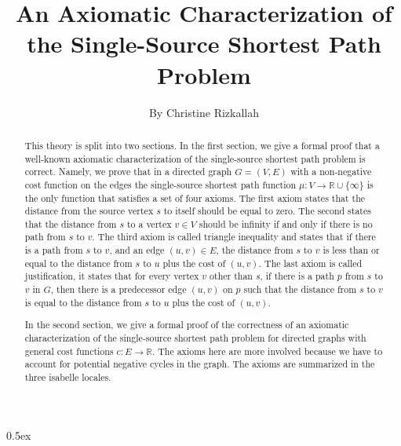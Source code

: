 \documentclass[11pt,a4paper]{article}
\newcommand{\real}{\mathbb{R}}
\begin{document}
\title{An Axiomatic Characterization of the Single-Source Shortest Path Problem}
\author{By Christine Rizkallah}
\maketitle

\begin{abstract}
 This theory is split into two sections. In the first section, we give a formal proof that a well-known axiomatic characterization of the single-source shortest path problem is correct. Namely, we prove that in a directed graph $G=(V,E)$ with a non-negative cost function on the edges the single-source shortest path function $\mu:V\to\real\cup\{\infty\}$ is the only function that satisfies a set of four axioms. The first axiom states that the distance from the source vertex $s$ to itself should be equal to zero. The second states that the distance from $s$ to a vertex $v\in V$ should be infinity if and only if there is no path from $s$ to $v$. The third axiom is called triangle inequality and states that if there is a path from $s$ to $v$, and an edge $(u,v)\in E$, the distance from $s$ to $v$ is less than or equal to the distance from $s$ to $u$ plus the cost of $(u,v)$. The last axiom is called justification, it states that for every vertex $v$ other than $s$, if there is a path $p$ from $s$ to $v$ in $G$, then there is a predecessor edge $(u,v)$ on $p$ such that the distance from $s$ to $v$ is equal to the distance from $s$ to $u$ plus the cost of $(u,v)$. 

In the second section, we give a formal proof of the correctness of an axiomatic characterization of the single-source shortest path problem for directed graphs with general cost functions $c:E\to\real$. The axioms here are more involved because we have to account for potential negative cycles in the graph. The axioms are summarized in the three isabelle locales. 
\end{abstract}

\tableofcontents

\parindent 0pt\parskip 0.5ex





\end{document}
